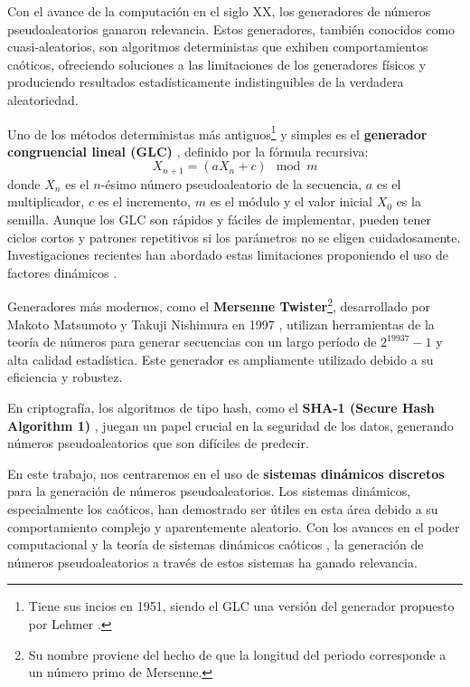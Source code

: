 \documentclass[../Main.tex]{subfiles}
\begin{document}
Con el avance de la computación en el siglo XX, los generadores de números pseudoaleatorios ganaron relevancia. Estos generadores, también conocidos como cuasi-aleatorios, son algoritmos deterministas que exhiben comportamientos caóticos, ofreciendo soluciones a las limitaciones de los generadores físicos y produciendo resultados estadísticamente indistinguibles de la verdadera aleatoriedad.

Uno de los métodos deterministas más antiguos\footnote{Tiene sus incios en 1951, siendo el GLC una versión  del generador propuesto por Lehmer \cite{Lehmer1951}.} y simples es el \textbf{generador congruencial lineal (GLC)} \cite{Lehmer1951,Knuth1997,BaltazarLarios2024}, definido por la fórmula recursiva:
\[ X_{n+1} = (aX_n + c) \mod m \]
donde $X_n$ es el $n$-ésimo número pseudoaleatorio de la secuencia, \(a\) es el multiplicador, \(c\) es el incremento, \(m\) es el módulo y el valor inicial $X_0$ es la semilla. Aunque los GLC son rápidos y fáciles de implementar, pueden tener ciclos cortos y patrones repetitivos si los parámetros no se eligen cuidadosamente. Investigaciones recientes han abordado estas limitaciones proponiendo el uso de factores dinámicos \cite{Alhomdy2015}.

Generadores más modernos, como el \textbf{Mersenne Twister}\footnote{Su nombre proviene del hecho de que la longitud del periodo corresponde a un número primo de Mersenne.}, desarrollado por Makoto Matsumoto y Takuji Nishimura en 1997 \cite{Matsumoto1998}, utilizan herramientas de la teoría de números para generar secuencias con un largo período 
de \(2^{19937}-1\) y alta calidad estadística. Este generador es ampliamente utilizado debido a su eficiencia y robustez.

En criptografía, los algoritmos de tipo hash, como el \textbf{SHA-1 (Secure Hash Algorithm 1)} \cite{Eastlake2001}, juegan un papel crucial en la seguridad de los datos, generando números pseudoaleatorios que son difíciles de predecir.

En este trabajo, nos centraremos en el uso de \textbf{sistemas dinámicos discretos} para la generación de números pseudoaleatorios. Los sistemas dinámicos, especialmente los caóticos, han demostrado ser útiles en esta área debido a su comportamiento complejo y aparentemente aleatorio. Con los avances en el poder computacional y la teoría de sistemas dinámicos caóticos \cite{Behnia2011,Szczepanski2001}, la generación de números pseudoaleatorios a través de estos sistemas ha ganado relevancia.
\end{document}
